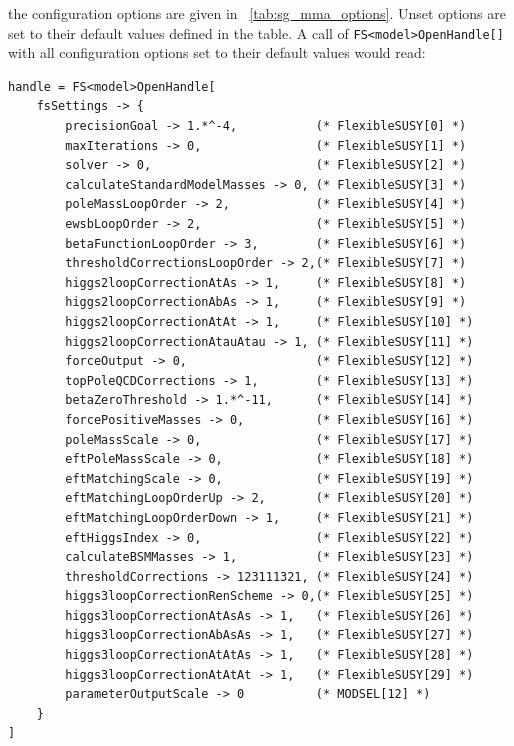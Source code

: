 \documentclass[final,3p,11pt,pdflatex]{elsarticle}
\newcommand{\code}[1]{\lstinline|#1|}  %
\newcommand{\tabref}[1]{\tablename~\ref{#1}}
\begin{document}
the configuration options are given in \tabref{tab:sg_mma_options}.
Unset options are set to their default values defined in the table.
A call of \code{FS<model>OpenHandle[]} with all configuration options
set to their default values would read:
%
\begin{lstlisting}
handle = FS<model>OpenHandle[
    fsSettings -> {
        precisionGoal -> 1.*^-4,           (* FlexibleSUSY[0] *)
        maxIterations -> 0,                (* FlexibleSUSY[1] *)
        solver -> 0,                       (* FlexibleSUSY[2] *)
        calculateStandardModelMasses -> 0, (* FlexibleSUSY[3] *)
        poleMassLoopOrder -> 2,            (* FlexibleSUSY[4] *)
        ewsbLoopOrder -> 2,                (* FlexibleSUSY[5] *)
        betaFunctionLoopOrder -> 3,        (* FlexibleSUSY[6] *)
        thresholdCorrectionsLoopOrder -> 2,(* FlexibleSUSY[7] *)
        higgs2loopCorrectionAtAs -> 1,     (* FlexibleSUSY[8] *)
        higgs2loopCorrectionAbAs -> 1,     (* FlexibleSUSY[9] *)
        higgs2loopCorrectionAtAt -> 1,     (* FlexibleSUSY[10] *)
        higgs2loopCorrectionAtauAtau -> 1, (* FlexibleSUSY[11] *)
        forceOutput -> 0,                  (* FlexibleSUSY[12] *)
        topPoleQCDCorrections -> 1,        (* FlexibleSUSY[13] *)
        betaZeroThreshold -> 1.*^-11,      (* FlexibleSUSY[14] *)
        forcePositiveMasses -> 0,          (* FlexibleSUSY[16] *)
        poleMassScale -> 0,                (* FlexibleSUSY[17] *)
        eftPoleMassScale -> 0,             (* FlexibleSUSY[18] *)
        eftMatchingScale -> 0,             (* FlexibleSUSY[19] *)
        eftMatchingLoopOrderUp -> 2,       (* FlexibleSUSY[20] *)
        eftMatchingLoopOrderDown -> 1,     (* FlexibleSUSY[21] *)
        eftHiggsIndex -> 0,                (* FlexibleSUSY[22] *)
        calculateBSMMasses -> 1,           (* FlexibleSUSY[23] *)
        thresholdCorrections -> 123111321, (* FlexibleSUSY[24] *)
        higgs3loopCorrectionRenScheme -> 0,(* FlexibleSUSY[25] *)
        higgs3loopCorrectionAtAsAs -> 1,   (* FlexibleSUSY[26] *)
        higgs3loopCorrectionAbAsAs -> 1,   (* FlexibleSUSY[27] *)
        higgs3loopCorrectionAtAtAs -> 1,   (* FlexibleSUSY[28] *)
        higgs3loopCorrectionAtAtAt -> 1,   (* FlexibleSUSY[29] *)
        parameterOutputScale -> 0          (* MODSEL[12] *)
    }
]
\end{lstlisting}
%
\end{document}
